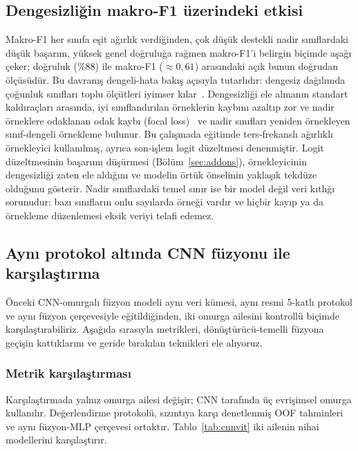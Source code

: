 \subsection{Dengesizliğin makro-F1 üzerindeki etkisi}
Makro-F1 her sınıfa eşit ağırlık verdiğinden, çok düşük destekli nadir sınıflardaki
düşük başarım, yüksek genel doğruluğa rağmen makro-F1'i belirgin biçimde aşağı çeker;
doğruluk (\%88) ile makro-F1 ($\approx 0{,}61$) arasındaki açık bunun doğrudan
ölçüsüdür. Bu davranış dengeli-hata bakış açısıyla tutarlıdır: dengesiz dağılımda
çoğunluk sınıfları toplu ölçütleri iyimser kılar~\cite{menon2020logitadjust}.
Dengesizliği ele almanın standart kaldıraçları arasında, iyi sınıflandırılan
örneklerin kaybını azaltıp zor ve nadir örneklere odaklanan odak kaybı
(focal loss)~\cite{lin2017focal} ve nadir sınıfları yeniden örnekleyen sınıf-dengeli
örnekleme bulunur. Bu çalışmada eğitimde ters-frekanslı ağırlıklı örnekleyici
kullanılmış, ayrıca son-işlem logit düzeltmesi denenmiştir. Logit düzeltmesinin
başarımı düşürmesi (Bölüm~\ref{sec:addons}), örnekleyicinin dengesizliği zaten ele
aldığını ve modelin örtük önselinin yaklaşık tekdüze olduğunu gösterir. Nadir
sınıflardaki temel sınır ise bir model değil veri kıtlığı sorunudur: bazı sınıfların
onlu sayılarda örneği vardır ve hiçbir kayıp ya da örnekleme düzenlemesi eksik veriyi
telafi edemez.

\subsection{Aynı protokol altında CNN füzyonu ile karşılaştırma}
\label{sec:cnnvit}
Önceki CNN-omurgalı füzyon modeli aynı veri kümesi, aynı resmi 5-katlı protokol ve
aynı füzyon çerçevesiyle eğitildiğinden, iki omurga ailesini kontrollü biçimde
karşılaştırabiliriz. Aşağıda sırasıyla metrikleri, dönüştürücü-temelli füzyona
geçişin kattıklarını ve geride bırakılan teknikleri ele alıyoruz.

\subsubsection{Metrik karşılaştırması}
Karşılaştırmada yalnız omurga ailesi değişir; CNN tarafında üç evrişimsel omurga
kullanılır. Değerlendirme protokolü, sızıntıya karşı denetlenmiş OOF tahminleri
ve aynı füzyon-MLP çerçevesi ortaktır. Tablo~\ref{tab:cnnvit} iki ailenin nihai
modellerini karşılaştırır.

